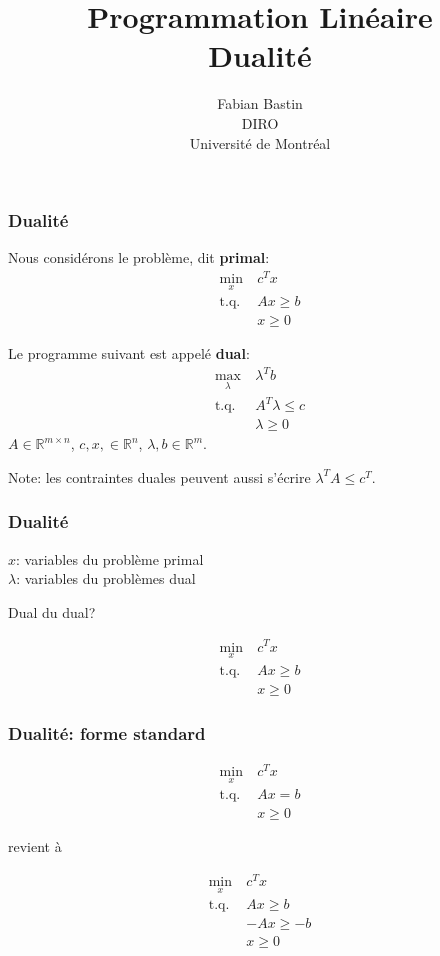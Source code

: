 \documentclass[usepdftitle=false]{beamer}
\title[Dualité]{Programmation Linéaire\\Dualité}
\author[Fabian Bastin]{Fabian Bastin\\DIRO\\Université de Montréal\\}
\date{}
\def\RR{\mathbb{R}}
\begin{document}
\frame{\titlepage}


\begin{frame}
\frametitle{Dualité}

Nous considérons le problème, dit {\bf primal}:
\begin{align*}
\min_x \ & c^T x \\
\mbox{t.q. } & Ax \geq b \\
& x \geq 0
\end{align*}

\mbox{}

Le programme suivant est appelé {\bf dual}:
\begin{align*}
\max_{\lambda} \ & \lambda^T b \\
\mbox{t.q. } & A^T \lambda \leq c \\
& \lambda \geq 0
\end{align*}
$A \in \RR^{m \times n}$, $c, x, \in \RR^n$, $\lambda, b \in \RR^m$.

Note: les contraintes duales peuvent aussi s'écrire $\lambda^T A \leq c^T$.

\end{frame}

\begin{frame}
\frametitle{Dualité}

$x$: variables du problème primal\\
$\lambda$: variables du problèmes dual

\mbox{}

Dual du dual?

\mbox{}

\begin{align*}
\min_x \ & c^T x \\
\mbox{t.q. } & Ax \geq b \\
& x \geq 0
\end{align*}

\end{frame}

\begin{frame}
\frametitle{Dualité: forme standard}

\begin{align*}
\min_x \ & c^T x \\
\mbox{t.q. } & Ax = b \\
& x \geq 0
\end{align*}

revient à

\begin{align*}
\min_x \ & c^T x \\
\mbox{t.q. } & Ax \geq b \\
& -Ax \geq -b \\
& x \geq 0
\end{align*}

\end{frame}
\end{document}
